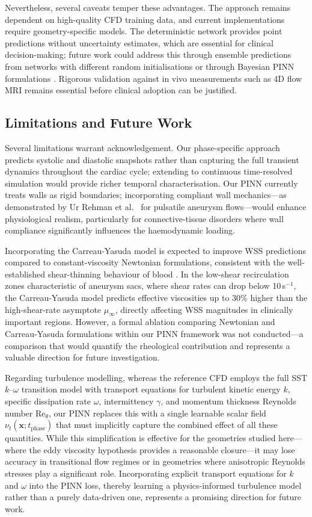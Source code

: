 \documentclass[11pt,a4paper]{article}
\begin{document}
Nevertheless, several caveats temper these advantages. The approach remains dependent on high-quality CFD training data, and current implementations require geometry-specific models. The deterministic network provides point predictions without uncertainty estimates, which are essential for clinical decision-making; future work could address this through ensemble predictions from networks with different random initialisations or through Bayesian PINN formulations \cite{ref20}. Rigorous validation against in vivo measurements such as 4D flow MRI remains essential before clinical adoption can be justified.

\subsection{Limitations and Future Work}

Several limitations warrant acknowledgement. Our phase-specific approach predicts systolic and diastolic snapshots rather than capturing the full transient dynamics throughout the cardiac cycle; extending to continuous time-resolved simulation would provide richer temporal characterisation. Our PINN currently treats walls as rigid boundaries; incorporating compliant wall mechanics---as demonstrated by Ur Rehman et al.\ \cite{ref_urrehman2025} for pulsatile aneurysm flows---would enhance physiological realism, particularly for connective-tissue disorders where wall compliance significantly influences the haemodynamic loading.

Incorporating the Carreau-Yasuda model is expected to improve WSS predictions compared to constant-viscosity Newtonian formulations, consistent with the well-established shear-thinning behaviour of blood \cite{ref18}. In the low-shear recirculation zones characteristic of aneurysm sacs, where shear rates can drop below 10\,s$^{-1}$, the Carreau-Yasuda model predicts effective viscosities up to 30\% higher than the high-shear-rate asymptote $\mu_\infty$, directly affecting WSS magnitudes in clinically important regions. However, a formal ablation comparing Newtonian and Carreau-Yasuda formulations within our PINN framework was not conducted---a comparison that would quantify the rheological contribution and represents a valuable direction for future investigation.

Regarding turbulence modelling, whereas the reference CFD employs the full SST $k$--$\omega$ transition model with transport equations for turbulent kinetic energy $k$, specific dissipation rate $\omega$, intermittency $\gamma$, and momentum thickness Reynolds number $\text{Re}_\theta$, our PINN replaces this with a single learnable scalar field $\nu_t(\mathbf{x}; t_{\text{phase}})$ that must implicitly capture the combined effect of all these quantities. While this simplification is effective for the geometries studied here---where the eddy viscosity hypothesis provides a reasonable closure---it may lose accuracy in transitional flow regimes or in geometries where anisotropic Reynolds stresses play a significant role. Incorporating explicit transport equations for $k$ and $\omega$ into the PINN loss, thereby learning a physics-informed turbulence model rather than a purely data-driven one, represents a promising direction for future work.
\end{document}
